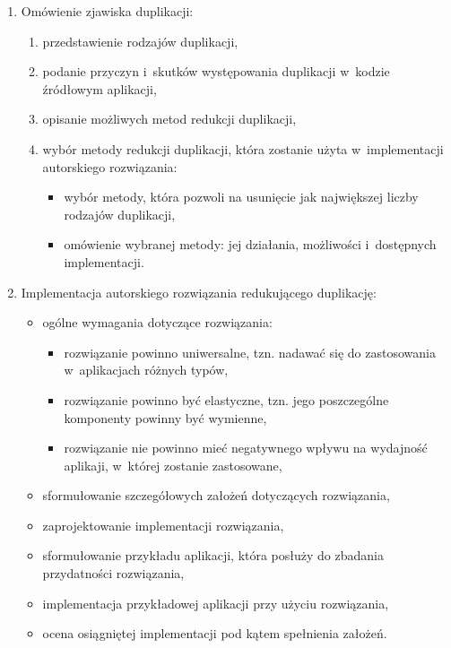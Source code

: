 \begin{enumerate}
 \item Omówienie zjawiska duplikacji:
  \begin{enumerate}
   \item przedstawienie rodzajów duplikacji,
   \item podanie przyczyn i~skutków występowania duplikacji w~kodzie źródłowym aplikacji,
   \item opisanie możliwych metod redukcji duplikacji,
   \item wybór metody redukcji duplikacji, która zostanie użyta w~implementacji autorskiego rozwiązania:
    \begin{itemize}
     \item wybór metody, która pozwoli na usunięcie jak największej liczby rodzajów duplikacji,
     \item omówienie wybranej metody: jej działania, możliwości i~dostępnych implementacji.
    \end{itemize}
  \end{enumerate}
 
 \item Implementacja autorskiego rozwiązania redukującego duplikację:
  \begin{itemize}
   \item ogólne wymagania dotyczące rozwiązania:
    \begin{itemize}
     \item rozwiązanie powinno uniwersalne, tzn. nadawać się do zastosowania w~aplikacjach różnych typów,
     \item rozwiązanie powinno być elastyczne, tzn. jego poszczególne komponenty powinny być wymienne,
     \item rozwiązanie nie powinno mieć negatywnego wpływu na wydajność aplikaji, w~której zostanie zastosowane,
    \end{itemize}
   \item sformułowanie szczegółowych założeń dotyczących rozwiązania,
   \item zaprojektowanie implementacji rozwiązania,
   \item sformułowanie przykładu aplikacji, która posłuży do zbadania przydatności rozwiązania,
   \item implementacja przykładowej aplikacji przy użyciu rozwiązania,
   \item ocena osiągniętej implementacji pod kątem spełnienia założeń.
  \end{itemize}
 

\end{enumerate}
